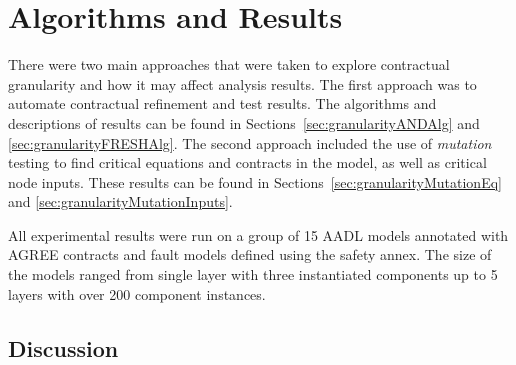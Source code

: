 \section{Algorithms and Results}
There were two main approaches that were taken to explore contractual granularity and how it may affect analysis results. The first approach was to automate contractual refinement and test results. The algorithms and descriptions of results can be found in Sections~\ref{sec:granularityANDAlg} and \ref{sec:granularityFRESHAlg}. The second approach included the use of {\em mutation} testing to find critical equations and contracts in the model, as well as critical node inputs. These results can be found in Sections~\ref{sec:granularityMutationEq} and \ref{sec:granularityMutationInputs}. 

All experimental results were run on a group of 15 AADL models annotated with AGREE contracts and fault models defined using the safety annex. The size of the models ranged from single layer with three instantiated components up to 5 layers with over 200 component instances. 



%
%


\subsection{Discussion}